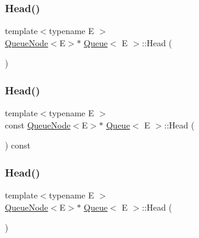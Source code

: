 \mbox{\label{class_queue_a71aa0154ef75bb87a53b6af1829fcd5e}} 
\subsubsection{\texorpdfstring{Head()}{Head()}\hspace{0.1cm}{\footnotesize\ttfamily [1/6]}}
{\footnotesize\ttfamily template$<$typename E $>$ \\
\mbox{\hyperlink{class_queue_node}{Queue\+Node}}$<$E$>$$\ast$ \mbox{\hyperlink{class_queue}{Queue}}$<$ E $>$\+::Head (\begin{DoxyParamCaption}{ }\end{DoxyParamCaption})\hspace{0.3cm}{\ttfamily [inline]}}

\mbox{\label{class_queue_a6c906075e0ad2d1f0634990aa106395e}} 
\subsubsection{\texorpdfstring{Head()}{Head()}\hspace{0.1cm}{\footnotesize\ttfamily [2/6]}}
{\footnotesize\ttfamily template$<$typename E $>$ \\
const \mbox{\hyperlink{class_queue_node}{Queue\+Node}}$<$E$>$$\ast$ \mbox{\hyperlink{class_queue}{Queue}}$<$ E $>$\+::Head (\begin{DoxyParamCaption}{ }\end{DoxyParamCaption}) const\hspace{0.3cm}{\ttfamily [inline]}}

\mbox{\label{class_queue_a71aa0154ef75bb87a53b6af1829fcd5e}} 
\subsubsection{\texorpdfstring{Head()}{Head()}\hspace{0.1cm}{\footnotesize\ttfamily [3/6]}}
{\footnotesize\ttfamily template$<$typename E $>$ \\
\mbox{\hyperlink{class_queue_node}{Queue\+Node}}$<$E$>$$\ast$ \mbox{\hyperlink{class_queue}{Queue}}$<$ E $>$\+::Head (\begin{DoxyParamCaption}{ }\end{DoxyParamCaption})\hspace{0.3cm}{\ttfamily [inline]}}

